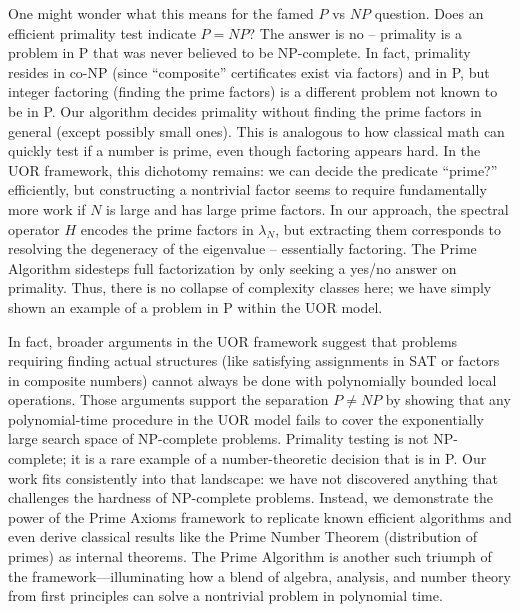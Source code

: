 \documentclass[11pt]{article}
\begin{document}
One might wonder what this means for the famed $P$ vs $NP$ question. Does an efficient primality test indicate $P = NP$? The answer is no – primality is a problem in P that was never believed to be NP-complete. In fact, primality resides in co-NP (since “composite” certificates exist via factors) and in P, but integer factoring (finding the prime factors) is a different problem not known to be in P. Our algorithm decides primality without finding the prime factors in general (except possibly small ones). This is analogous to how classical math can quickly test if a number is prime, even though factoring appears hard. In the UOR framework, this dichotomy remains: we can decide the predicate “prime?” efficiently, but constructing a nontrivial factor seems to require fundamentally more work if $N$ is large and has large prime factors. In our approach, the spectral operator $H$ encodes the prime factors in $\lambda_N$, but extracting them corresponds to resolving the degeneracy of the eigenvalue – essentially factoring. The Prime Algorithm sidesteps full factorization by only seeking a yes/no answer on primality. Thus, there is no collapse of complexity classes here; we have simply shown an example of a problem in P within the UOR model.

In fact, broader arguments in the UOR framework suggest that problems requiring finding actual structures (like satisfying assignments in SAT or factors in composite numbers) cannot always be done with polynomially bounded local operations. Those arguments support the separation $P \neq NP$ by showing that any polynomial-time procedure in the UOR model fails to cover the exponentially large search space of NP-complete problems. Primality testing is not NP-complete; it is a rare example of a number-theoretic decision that is in P. Our work fits consistently into that landscape: we have not discovered anything that challenges the hardness of NP-complete problems. Instead, we demonstrate the power of the Prime Axioms framework to replicate known efficient algorithms and even derive classical results like the Prime Number Theorem (distribution of primes) as internal theorems. The Prime Algorithm is another such triumph of the framework—illuminating how a blend of algebra, analysis, and number theory from first principles can solve a nontrivial problem in polynomial time.
\end{document}
